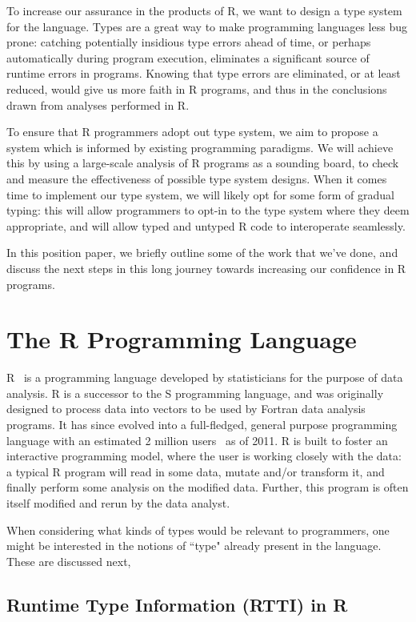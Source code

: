 \documentclass[sigplan,10pt,review,anonymous]{acmart}\settopmatter{printfolios=true,printccs=false,printacmref=false}
\begin{document}
To increase our assurance in the products of R, we want to design a type system for the language.
Types are a great way to make programming languages less bug prone:
catching potentially insidious type errors ahead of time, or perhaps automatically during program execution, eliminates a significant source of runtime errors in programs.
Knowing that type errors are eliminated, or at least reduced, would give us more faith in R programs, and thus in the conclusions drawn from analyses performed in R.

To ensure that R programmers adopt out type system, we aim to propose a system which is informed by existing programming paradigms.
We will achieve this by using a large-scale analysis of R programs as a sounding board, to check and measure the effectiveness of possible type system designs.
When it comes time to implement our type system, we will likely opt for some form of gradual typing:
this will allow programmers to opt-in to the type system where they deem appropriate, and will allow typed and untyped R code to interoperate seamlessly.

In this position paper, we briefly outline some of the work that we've done, and discuss the next steps in this long journey towards increasing our confidence in R programs.

%
%
%
%
\section{The R Programming Language}

R~\cite{R_man} is a programming language developed by statisticians for the purpose of data analysis.
R is a successor to the S programming language, and was originally designed to process data into vectors to be used by Fortran data analysis programs.
It has since evolved into a full-fledged, general purpose programming language with an estimated 2 million users~\cite{eco11} as of 2011.
R is built to foster an interactive programming model, where the user is working closely with the data:
a typical R program will read in some data, mutate and/or transform it, and finally perform some analysis on the modified data.
Further, this program is often itself modified and rerun by the data analyst.

When considering what kinds of types would be relevant to programmers, one might be interested in the notions of ``type" already present in the language.
These are discussed next,

%
%
\subsection{Runtime Type Information (RTTI) in R}
\end{document}
